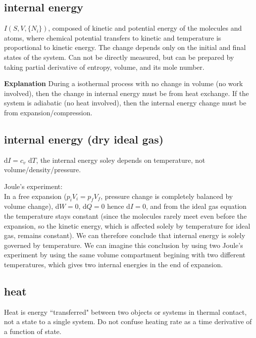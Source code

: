 \subsection{internal energy}
\begin{defn*} $I(S,V,\{N_i\})$, composed of kinetic and potential energy of the molecules and
atoms, where chemical potential transfers to kinetic and temperature is proportional to kinetic
energy. The change depends only on the initial and final states of the system. Can not be directly
measured, but can be prepared by taking partial derivative of entropy, volume, and its mole number. \\
\end{defn*}

{\bf Explanation} During a isothermal process with no change in volume (no work involved), then the
change in internal energy must be from heat exchange. If the system is adiabatic (no heat involved),
then the internal energy change must be from expansion/compression.

\subsection{internal energy (dry ideal gas)}
\begin{defn*} d$I = c_v$ d$T$, the internal energy soley depends on temperature, not
volume/density/pressure. \\
\end{defn*}


{Joule's experiment:} \\
In a free expansion ($p_iV_i = p_fV_f$, pressure change is completely balanced by volume change),
d$W = 0$, d$Q = 0$ hence d$I = 0$, and from the ideal gas equation the temperature stays constant
(since the molecules rarely meet even before the expansion, so the kinetic energy, which is affected
solely by temperature for ideal gas, remains constant). We can therefore conclude that internal
energy is solely governed by temperature. We can imagine this conclusion by using two Joule's
experiment by using the same volume compartment begining with two different temperatures, which
gives two internal energies in the end of expansion. 


\subsection{heat}
\begin{defn*} Heat is energy ``transferred" between two objects or systems in thermal contact, not
a state to a single system. Do not confuse heating rate as a time derivative of a function of state.
\end{defn*}


